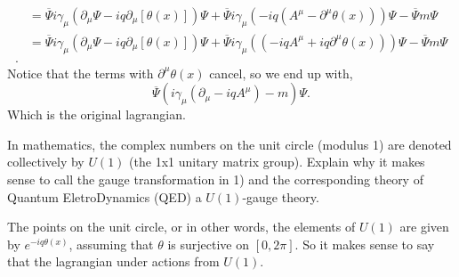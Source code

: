 \documentclass[working, oneside]{../../../Preambles/tuftebook}
\begin{document}
\begin{solution}
\begin{align*}
     &= \overline{\Psi}i\gamma_{\mu }\left(   \partial_{\mu }\Psi - iq\partial_{\mu }\left[ \theta \left( x \right)  \right] \right)\Psi + \overline{\Psi}i\gamma_{\mu }\left( -iq\left( A^{\mu }-\partial^{\mu }\theta \left( x \right)  \right)  \right)\Psi - \overline{\Psi}m\Psi \\
     &= \overline{\Psi}i\gamma_{\mu }\left(   \partial_{\mu }\Psi - iq\partial_{\mu }\left[ \theta \left( x \right)  \right] \right)\Psi + \overline{\Psi}i\gamma_{\mu }\left( \left( -iqA^{\mu }+iq\partial^{\mu }\theta \left( x \right)  \right)  \right)\Psi - \overline{\Psi}m\Psi \\
.\end{align*}
Notice that the terms with $\partial^{\mu }\theta \left( x \right) $ cancel, so we end up with,
\[
\overline{\Psi}\left( i\gamma_{\mu }\left( \partial_{\mu } - iqA^{\mu } \right) -m  \right) \Psi
.\] 
Which is the original lagrangian.
\end{solution}
\begin{exercise}[2]
In mathematics, the complex numbers on the unit circle (modulus 1) are denoted collectively by \( U(1) \) (the 1x1 unitary matrix group). Explain why it makes sense to call the gauge transformation in 1) and the corresponding theory of Quantum EletroDynamics (QED) a \( U(1) \)-gauge theory.
\end{exercise}
\begin{solution}
The points on the unit circle, or in other words, the elements of $U\left( 1 \right) $ are given by $e^{-iq\theta \left( x \right) }$, assuming that $\theta $ is surjective on $\left[ 0, 2\pi \right] $. So it makes sense to say that the lagrangian under actions from  $U\left( 1 \right) $.
\end{solution}
\end{document}
